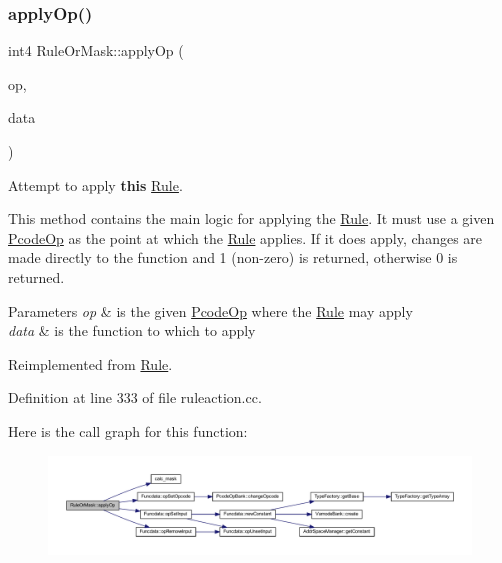 \subsubsection{\texorpdfstring{applyOp()}{applyOp()}}
{\footnotesize\ttfamily int4 Rule\+Or\+Mask\+::apply\+Op (\begin{DoxyParamCaption}\item[{\mbox{\hyperlink{class_pcode_op}{Pcode\+Op}} $\ast$}]{op,  }\item[{\mbox{\hyperlink{class_funcdata}{Funcdata}} \&}]{data }\end{DoxyParamCaption})\hspace{0.3cm}{\ttfamily [virtual]}}



Attempt to apply {\bfseries{this}} \mbox{\hyperlink{class_rule}{Rule}}. 

This method contains the main logic for applying the \mbox{\hyperlink{class_rule}{Rule}}. It must use a given \mbox{\hyperlink{class_pcode_op}{Pcode\+Op}} as the point at which the \mbox{\hyperlink{class_rule}{Rule}} applies. If it does apply, changes are made directly to the function and 1 (non-\/zero) is returned, otherwise 0 is returned. 
\begin{DoxyParams}{Parameters}
{\em op} & is the given \mbox{\hyperlink{class_pcode_op}{Pcode\+Op}} where the \mbox{\hyperlink{class_rule}{Rule}} may apply \\
\hline
{\em data} & is the function to which to apply \\
\hline
\end{DoxyParams}


Reimplemented from \mbox{\hyperlink{class_rule_a4e3e61f066670175009f60fb9dc60848}{Rule}}.



Definition at line 333 of file ruleaction.\+cc.

Here is the call graph for this function\+:
\nopagebreak
\begin{figure}[H]
\begin{center}
\leavevmode
\includegraphics[width=350pt]{class_rule_or_mask_ab0e9a7d945a09be5c298cd08937ab6a7_cgraph}
\end{center}
\end{figure}
\mbox{\label{class_rule_or_mask_a3e58258633ca9f6a88262b88b95672a1}} 
